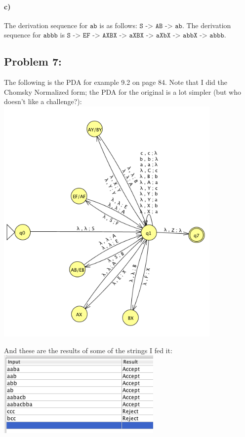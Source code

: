 \documentclass[a4paper]{article}
\begin{document}
\paragraph{c)} The derivation sequence for $\texttt{ab}$ is as follows: $\texttt{S -> AB -> ab}$. The derivation sequence for $\texttt{abbb}$ is $\texttt{S -> EF -> AXBX -> aXBX -> aXbX -> abbX -> abbb}$.

\subsection*{Problem 7:} 

The following is the PDA for example 9.2 on page 84. Note that I did the Chomsky Normalized form; the PDA for the original is a lot simpler (but who doesn't like a challenge?):\\
\includegraphics[width=110mm]{7_pda.png}

And these are the results of some of the strings I fed it:\\
\includegraphics[width=80mm]{7_results.png}
\end{document}
